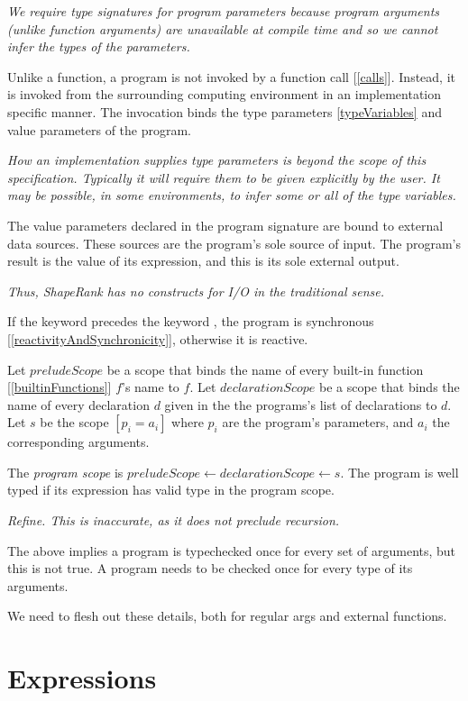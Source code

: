 \documentclass{article}
\begin{document}
{\em
We require type signatures for program parameters because program arguments (unlike function arguments) are unavailable at compile time and so we cannot
infer the types of the parameters.
}

Unlike a function, a program is not invoked by a function call [\ref{calls}]. Instead, it is invoked from the surrounding computing environment in an implementation specific manner.  The invocation binds the type parameters \ref{typeVariables} and value parameters of the program. 

{\em
How an implementation supplies type parameters is beyond the scope of this specification. Typically it will require them to be given explicitly by the user.
It may be possible, in some environments, to infer some or all of the type variables.
}

The value parameters declared in the program signature are bound to external data sources. These sources are the program's sole source of input. The program's result is the value of its expression, and this is its sole external output. 

{\em 
Thus, ShapeRank has no constructs for I/O in the traditional sense.
}

If the keyword \SYNC precedes the keyword \PROGRAM, the program is synchronous [\ref{reactivityAndSynchronicity}], otherwise it is reactive.

Let $preludeScope$ be a scope that binds the name of every built-in function [\ref{builtinFunctions}] $f$'s name to $f$.
Let $declarationScope$ be a scope that binds the name of every declaration $d$ given in the the programs's list of declarations to $d$.
Let $s$ be the scope $[p_i = a_i]$  where $p_i$ are the program's parameters, and $a_i$ the corresponding arguments.

The {\em program scope} is $preludeScope \leftarrow declarationScope \leftarrow s$.  
The program is well typed if its expression has valid type in the program scope.

{\em Refine. This is inaccurate, as it does not preclude recursion.

The above implies a program is typechecked once for every set of  arguments, but this is not true.  A program needs to be checked once for every type of its arguments. 

We need to flesh out these details, both for regular args and external functions.

}

\section{Expressions}
\label{expressions}
\end{document}
